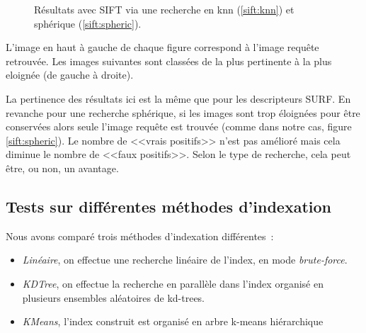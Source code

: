 \documentclass[a4paper]{article}
\begin{document}
\begin{figure}[!ht]%
  \centering
  \hspace{0.01\textwidth}
  \caption{Résultats avec SIFT via une recherche en knn (\ref{sift:knn}) et sphérique (\ref{sift:spheric}).}
  \label{sift}
\end{figure}

L'image en haut à gauche de chaque figure correspond à l'image requête retrouvée. Les images suivantes sont
classées de la plus pertinente à la plus eloignée (de gauche à droite).

La pertinence des résultats ici est la même que pour les descripteurs SURF. En revanche pour une recherche sphérique, 
si les images sont trop éloignées pour être conservées alors seule l'image requête est trouvée (comme dans
notre cas, figure \ref{sift:spheric}).
Le nombre de <<vrais positifs>> n'est pas amélioré mais cela diminue 
le nombre de <<faux positifs>>. Selon le type de recherche, cela peut être, ou non, un avantage.

\subsection{Tests sur différentes méthodes d'indexation}

Nous avons comparé trois méthodes d'indexation différentes~:

\begin{itemize}
    \item {\em Linéaire}, on effectue une recherche linéaire de l'index, en mode {\em brute-force}.
    \item {\em KDTree}, on effectue la recherche en parallèle dans l'index organisé en plusieurs ensembles aléatoires de kd-trees.
    \item {\em KMeans}, l'index construit est organisé en arbre k-means hiérarchique
\end{itemize}
\end{document}
